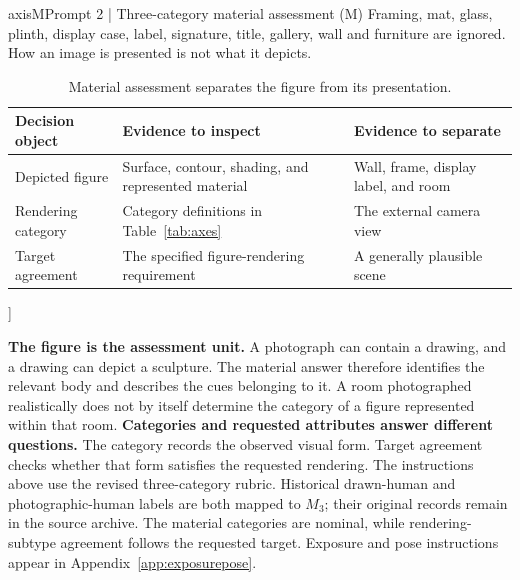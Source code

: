 {\begin{minipage}{\textwidth}
\begin{promptcard}{axisM}{Prompt 2 | Three-category material assessment (M)}
Framing, mat, glass, plinth, display case, label, signature, title, gallery,
wall and furniture are ignored. How an image is presented is not what it
depicts.
\end{promptcard}\begin{table}[H]
\centering\normalsize
\renewcommand{\arraystretch}{1.16}
\begin{tabularx}{\linewidth}{@{}lXX@{}}
\toprule
Decision object & Evidence to inspect & Evidence to separate \\
\midrule
Depicted figure & Surface, contour, shading, and represented material & Wall, frame, display label, and room \\
Rendering category & Category definitions in Table~\ref{tab:axes} & The external camera view \\
Target agreement & The specified figure-rendering requirement & A generally plausible scene \\
\bottomrule
\end{tabularx}
\caption{Material assessment separates the figure from its presentation.}\label{tab:appmaterialrules}
\end{table}
\end{minipage}}]

\textbf{The figure is the assessment unit.} A photograph can contain a drawing, and a drawing can depict a sculpture. The material answer therefore identifies the relevant body and describes the cues belonging to it. A room photographed realistically does not by itself determine the category of a figure represented within that room.
\newpage
\textbf{Categories and requested attributes answer different questions.} The category records the observed visual form. Target agreement checks whether that form satisfies the requested rendering. The instructions above use the revised three-category rubric. Historical drawn-human and photographic-human labels are both mapped to $M_3$; their original records remain in the source archive. The material categories are nominal, while rendering-subtype agreement follows the requested target. Exposure and pose instructions appear in Appendix~\ref{app:exposurepose}.

